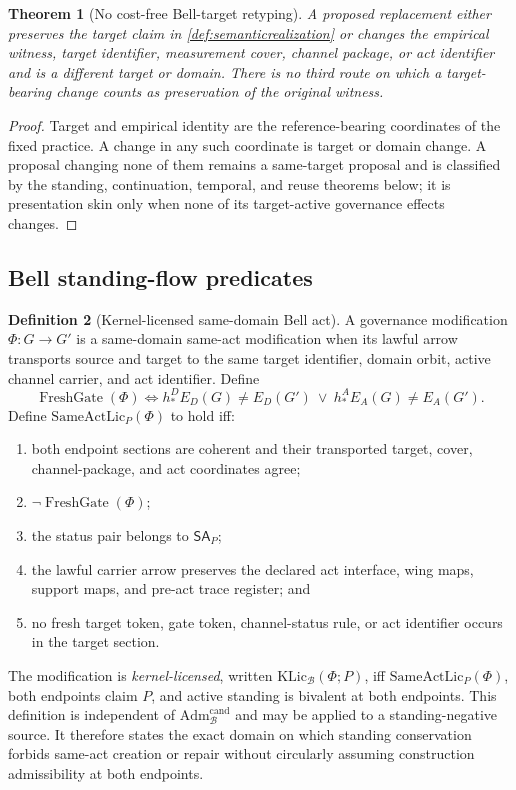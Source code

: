 \documentclass[11pt]{article}
\newtheorem{theorem}{Theorem}[section]
\theoremstyle{definition}
\newtheorem{definition}[theorem]{Definition}
\newcommand{\Bell}{\mathcal{B}}
\newcommand{\AdmBell}{\mathrm{Adm}^{\mathrm{cand}}_{\Bell}}
\newcommand{\KernelLic}{\mathrm{KLic}_{\Bell}}
\newcommand{\SameActLic}{\mathrm{SameActLic}_{P}}
\begin{document}
\begin{theorem}[No cost-free Bell-target retyping]\label{thm:nocostfreeretyping}
A proposed replacement either preserves the target claim in \cref{def:semanticrealization} or changes the empirical witness, target identifier, measurement cover, channel package, or act identifier and is a different target or domain. There is no third route on which a target-bearing change counts as preservation of the original witness.
\end{theorem}
\begin{proof}
Target and empirical identity are the reference-bearing coordinates of the fixed practice. A change in any such coordinate is target or domain change. A proposal changing none of them remains a same-target proposal and is classified by the standing, continuation, temporal, and reuse theorems below; it is presentation skin only when none of its target-active governance effects changes.
\end{proof}

\subsection{Bell standing-flow predicates}

\begin{definition}[Kernel-licensed same-domain Bell act]\label{def:samedomainact}
A governance modification $\Phi:G\to G'$ is a same-domain same-act modification when its lawful arrow transports source and target to the same target identifier, domain orbit, active channel carrier, and act identifier. Define
\[
\operatorname{FreshGate}(\Phi)
\iff
h_*^DE_D(G)\neq E_D(G')\ \lor\
h_*^AE_A(G)\neq E_A(G').
\]
Define $\SameActLic(\Phi)$ to hold iff:
\begin{enumerate}[label=(S\arabic*),leftmargin=3em]
\item both endpoint sections are coherent and their transported target, cover, channel-package, and act coordinates agree;
\item $\neg\operatorname{FreshGate}(\Phi)$;
\item the status pair belongs to $\mathsf{SA}_P$;
\item the lawful carrier arrow preserves the declared act interface, wing maps, support maps, and pre-act trace register; and
\item no fresh target token, gate token, channel-status rule, or act identifier occurs in the target section.
\end{enumerate}
The modification is \emph{kernel-licensed}, written $\KernelLic(\Phi;P)$, iff $\SameActLic(\Phi)$, both endpoints claim $P$, and active standing is bivalent at both endpoints. This definition is independent of $\AdmBell$ and may be applied to a standing-negative source. It therefore states the exact domain on which standing conservation forbids same-act creation or repair without circularly assuming construction admissibility at both endpoints.
\end{definition}
\end{document}

